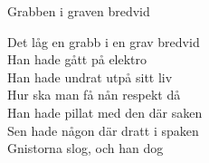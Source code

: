   {\Large Grabben i graven bredvid}
  \begin{vers}
Det låg en grabb i en grav bredvid\\
Han hade gått på elektro\\
Han hade undrat utpå sitt liv\\
Hur ska man få nån respekt då\\
Han hade pillat med den där saken\\
Sen hade någon där dratt i spaken\\
Gnistorna slog, och han dog\\
\end{vers}